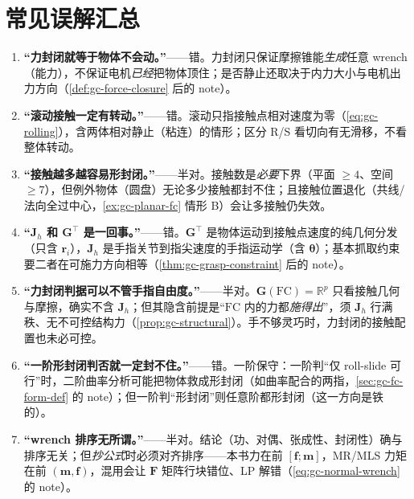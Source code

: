 \section*{常见误解汇总}
\begin{enumerate}
  \item \textbf{“力封闭就等于物体不会动。”}——错。力封闭只保证摩擦锥能\emph{生成}任意 wrench（能力），不保证电机\emph{已经}把物体顶住；是否静止还取决于内力大小与电机出力方向（\cref{def:gc-force-closure} 后的 note）。
  \item \textbf{“滚动接触一定有转动。”}——错。滚动只指接触点相对速度为零（\cref{eq:gc-rolling}），含两体相对静止（粘连）的情形；区分 R/S 看切向有无滑移，不看整体转动。
  \item \textbf{“接触越多越容易形封闭。”}——半对。接触数是\emph{必要}下界（平面 $\ge4$、空间 $\ge7$），但例外物体（圆盘）无论多少接触都封不住；且接触位置退化（共线/法向全过中心，\cref{ex:gc-planar-fc} 情形 B）会让多接触仍失效。
  \item \textbf{“$\mathbf{J}_h$ 和 $\mathbf{G}^\top$ 是一回事。”}——错。$\mathbf{G}^\top$ 是物体运动到接触点速度的纯几何分发（只含 $\mathbf{r}_i$），$\mathbf{J}_h$ 是手指关节到指尖速度的手指运动学（含 $\boldsymbol{\theta}$）；基本抓取约束要二者在可施力方向相等（\cref{thm:gc-grasp-constraint} 后的 note）。
  \item \textbf{“力封闭判据可以不管手指自由度。”}——半对。$\mathbf{G}(\mathrm{FC})=\mathbb{R}^p$ 只看接触几何与摩擦，确实不含 $\mathbf{J}_h$；但其隐含前提是“$\mathrm{FC}$ 内的力都\emph{施得出}”，须 $\mathbf{J}_h$ 行满秩、无不可控结构力（\cref{prop:gc-structural}）。手不够灵巧时，力封闭的接触配置也未必可控。
  \item \textbf{“一阶形封闭判否就一定封不住。”}——错。一阶保守：一阶判“仅 roll-slide 可行”时，二阶曲率分析可能把物体救成形封闭（如曲率配合的两指，\cref{sec:gc-fc-form-def} 的 note）；但一阶判“形封闭”则任意阶都形封闭（这一方向是铁的）。
  \item \textbf{“wrench 排序无所谓。”}——半对。结论（功、对偶、张成性、封闭性）确与排序无关；但\emph{抄公式}时必须对齐排序——本书力在前 $[\mathbf{f};\mathbf{m}]$，MR/MLS 力矩在前 $(\mathbf{m},\mathbf{f})$，混用会让 $\mathbf{F}$ 矩阵行块错位、LP 解错（\cref{eq:gc-normal-wrench} 的 note）。
\end{enumerate}

